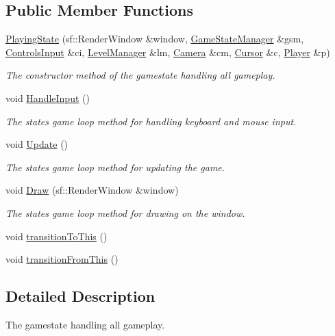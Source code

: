 \subsection*{Public Member Functions}
\begin{DoxyCompactItemize}
\item 
\hyperlink{class_playing_state_a81610cb256b5a4394200cef8aba82ade}{Playing\+State} (sf\+::\+Render\+Window \&window, \hyperlink{class_game_state_manager}{Game\+State\+Manager} \&gsm, \hyperlink{struct_controls_input}{Controls\+Input} \&ci, \hyperlink{class_level_manager}{Level\+Manager} \&lm, \hyperlink{class_camera}{Camera} \&cm, \hyperlink{class_cursor}{Cursor} \&c, \hyperlink{class_player}{Player} \&p)
\begin{DoxyCompactList}\small\item\em The constructor method of the gamestate handling all gameplay. \end{DoxyCompactList}\item 
void \hyperlink{class_playing_state_ab61fc6f59f00ccf5db80f67d5e4c50a1}{Handle\+Input} ()
\begin{DoxyCompactList}\small\item\em The state\textquotesingle{}s game loop method for handling keyboard and mouse input. \end{DoxyCompactList}\item 
void \hyperlink{class_playing_state_afb7ccd732dfaad4397b5096876092136}{Update} ()
\begin{DoxyCompactList}\small\item\em The state\textquotesingle{}s game loop method for updating the game. \end{DoxyCompactList}\item 
void \hyperlink{class_playing_state_a6f5feffc1c6de994450828fbe2f5c173}{Draw} (sf\+::\+Render\+Window \&window)
\begin{DoxyCompactList}\small\item\em The state\textquotesingle{}s game loop method for drawing on the window. \end{DoxyCompactList}\item 
void \hyperlink{class_playing_state_af3c78b678960f69e5130ca84c1761d1f}{transition\+To\+This} ()
\item 
void \hyperlink{class_playing_state_a15418b49381b61c98d6b9cdc5d3a83d1}{transition\+From\+This} ()
\end{DoxyCompactItemize}


\subsection{Detailed Description}
The gamestate handling all gameplay. 


